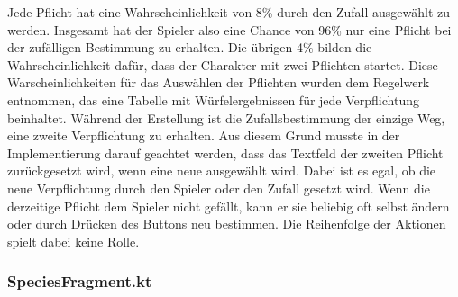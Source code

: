 Jede Pflicht hat eine Wahrscheinlichkeit von 8\% durch den Zufall ausgewählt zu werden. Insgesamt hat der Spieler also eine Chance von 96\% nur eine Pflicht bei der zufälligen Bestimmung zu erhalten. Die übrigen 4\% bilden die Wahrscheinlichkeit dafür, dass der Charakter mit zwei Pflichten startet. Diese Warscheinlichkeiten für das Auswählen der Pflichten wurden dem Regelwerk \cite[39]{rulebook} entnommen, das eine Tabelle mit Würfelergebnissen für jede Verpflichtung beinhaltet. Während der Erstellung ist die Zufallsbestimmung der einzige Weg, eine zweite Verpflichtung zu erhalten. Aus diesem Grund musste in der Implementierung darauf geachtet werden, dass das Textfeld der zweiten Pflicht zurückgesetzt wird, wenn eine neue ausgewählt wird. Dabei ist es egal, ob die neue Verpflichtung durch den Spieler oder den Zufall gesetzt wird. Wenn die derzeitige Pflicht dem Spieler nicht gefällt, kann er sie beliebig oft selbst ändern oder durch Drücken des Buttons neu bestimmen. Die Reihenfolge der Aktionen spielt dabei keine Rolle.\\

\subsubsection{SpeciesFragment.kt}

